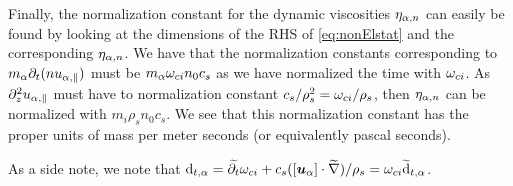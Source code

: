 Finally, the normalization constant for the dynamic viscosities $\eta_{\alpha,n}$ can easily be found by looking at the dimensions of the RHS of \cref{eq:nonElstat} and the corresponding $\eta_{\alpha,n}$.
We have that the normalization constants corresponding to $m_\alpha \partial_t(nu_{\alpha,\|})$ must be $m_\alpha\omega_{ci}n_0c_s$ as we have normalized the time with $\omega_{ci}$.
As $\partial_z^2 u_{\alpha,\|}$ must have to normalization constant $c_s/\rho_s^2=\omega_{ci}/\rho_s$, then $\eta_{\alpha,n}$ can be normalized with $m_i\rho_s n_0c_s$.
We see that this normalization constant has the proper units of mass per meter seconds (or equivalently pascal seconds).

As a side note, we note that
$\text{d}_{t,\alpha} = \widetilde{ \partial_t}\omega_{ci} + c_s ([\boldsymbol{u}_\alpha]\cdot
    \widetilde{ \nabla})/{\rho_s} = \omega_{ci}\widetilde{ \text{d}}_{t,\alpha}$.

